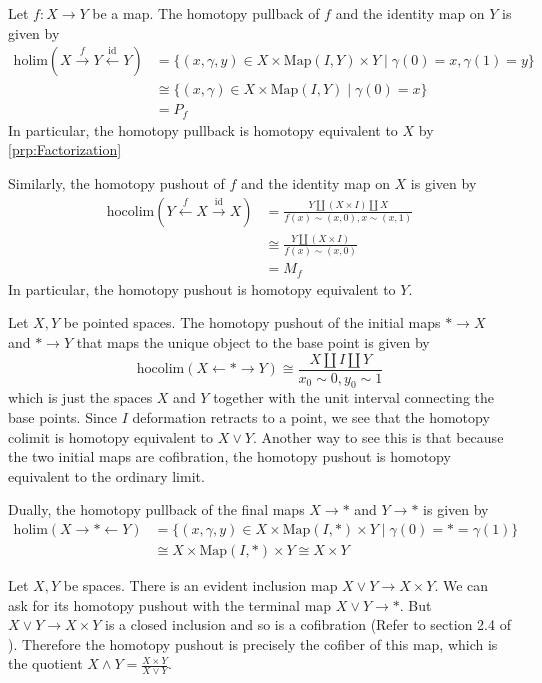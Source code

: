 \begin{eg}\label{eg:Identity} Let $f:X\to Y$ be a map. The homotopy pullback of $f$ and the identity map on $Y$ is given by 
\begin{align*}
\text{holim}(X\overset{f}{\rightarrow}Y\overset{\text{id}}{\leftarrow}Y)&=\{(x,\gamma,y)\in X\times\text{Map}(I,Y)\times Y\;|\;\gamma(0)=x,\gamma(1)=y\}\\
&\cong\{(x,\gamma)\in X\times\text{Map}(I,Y)\;|\;\gamma(0)=x\}\\
&=P_f
\end{align*}
In particular, the homotopy pullback is homotopy equivalent to $X$ by \ref{prp:Factorization}

Similarly, the homotopy pushout of $f$ and the identity map on $X$ is given by \begin{align*}
\text{hocolim}(Y\overset{f}{\leftarrow}X\overset{\text{id}}{\rightarrow}X)&=\frac{Y\amalg(X\times I)\amalg X}{f(x)\sim(x,0), x\sim(x,1)}\\
&\cong\frac{Y\amalg(X\times I)}{f(x)\sim(x,0)}\\
&=M_f
\end{align*}
In particular, the homotopy pushout is homotopy equivalent to $Y$. 
\end{eg}

\begin{eg}\label{eg:Wedge&Prod} Let $X,Y$ be pointed spaces. The homotopy pushout of the initial maps $\ast\to X$ and $\ast\to Y$ that maps the unique object to the base point is given by $$\text{hocolim}(X\leftarrow\ast\rightarrow Y)\cong\frac{X\amalg I\amalg Y}{x_0\sim 0,y_0\sim 1}$$ which is just the spaces $X$ and $Y$ together with the unit interval connecting the base points. Since $I$ deformation retracts to a point, we see that the homotopy colimit is homotopy equivalent to $X\vee Y$. Another way to see this is that because the two initial maps are cofibration, the homotopy pushout is homotopy equivalent to the ordinary limit.  

Dually, the homotopy pullback of the final maps $X\to\ast$ and $Y\to\ast$ is given by 
\begin{align*}
\text{holim}(X\rightarrow\ast\leftarrow Y)&=\{(x,\gamma,y)\in X\times\text{Map}(I,\ast)\times Y\;|\;\gamma(0)=\ast=\gamma(1)\}\\
&\cong X\times\text{Map}(I,\ast)\times Y\cong X\times Y
\end{align*}
\end{eg}

\begin{eg}\label{eg:Smash} Let $X,Y$ be spaces. There is an evident inclusion map $X\vee Y\to X\times Y$. We can ask for its homotopy pushout with the terminal map $X\vee Y\to\ast$. But $X\vee Y\to X\times Y$ is a closed inclusion and so is a cofibration (Refer to section 2.4 of \cite{MC}). Therefore the homotopy pushout is precisely the cofiber of this map, which is the quotient $X\wedge Y=\frac{X\times Y}{X\vee Y}$. 
\end{eg}

